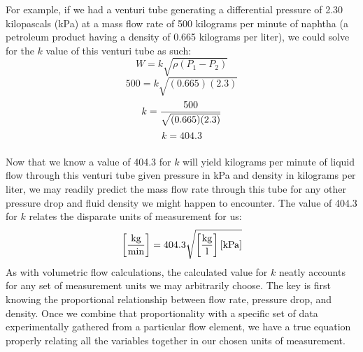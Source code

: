 \documentclass{beamer}
\begin{document}
	


%
%
%
\begin{frame}
	\frametitle{}

	


%
For example, if we had a venturi tube generating a differential pressure of 2.30 kilopascals (kPa) at a mass flow rate of 500 kilograms per minute of naphtha (a petroleum product having a density of 0.665 kilograms per liter), we could solve for the $k$ value of this venturi tube as such:
%
$$W = k \sqrt{\rho(P_1 - P_2)}$$
%
$$500 = k \sqrt{(0.665)(2.3)}$$
%
$$k = {500 \over \sqrt{(0.665)(2.3)}}$$
%
$$k = 404.3$$
\end{frame}

	\begin{frame}
		\frametitle{}

		


Now that we know a value of 404.3 for $k$ will yield kilograms per minute of liquid flow through this venturi tube given pressure in kPa and density in kilograms per liter, we may readily predict the mass flow rate through this tube for any other pressure drop and fluid density we might happen to encounter.  The value of 404.3 for $k$ relates the disparate units of measurement for us: 
%
$$\left[\hbox{kg} \over \hbox{min}\right] = 404.3 \sqrt{\left[\hbox{kg} \over \hbox{l}\right] \left[\hbox{kPa}\right]}$$
%
As with volumetric flow calculations, the calculated value for $k$ neatly accounts for any set of measurement units we may arbitrarily choose.  The key is first knowing the proportional relationship between flow rate, pressure drop, and density.  Once we combine that proportionality with a specific set of data experimentally gathered from a particular flow element, we have a true equation properly relating all the variables together in our chosen units of measurement. 
%
\end{frame}
\end{document}

